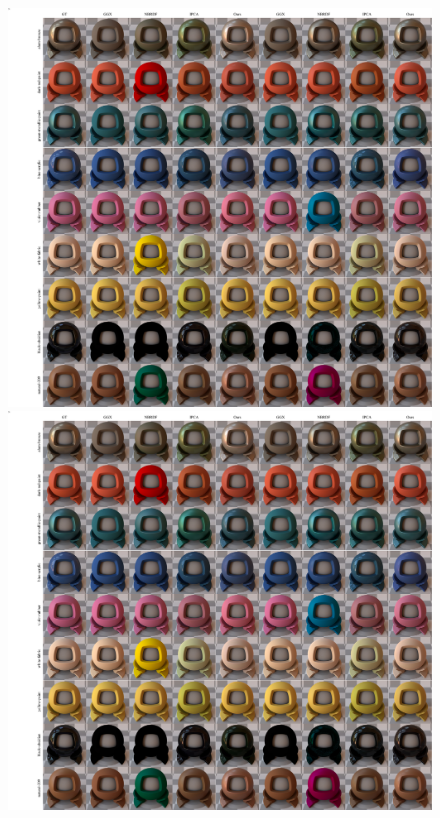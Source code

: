 \begin{figure}[t]
  {\includegraphics[width=0.9\linewidth]{Chapters/hyperbrdf-figs/qual_comp_ggx_2.pdf}}
%
{\includegraphics[width=0.9\linewidth]{Chapters/hyperbrdf-figs/qual_comp_ggx_2.pdf}}
%

\end{figure}
